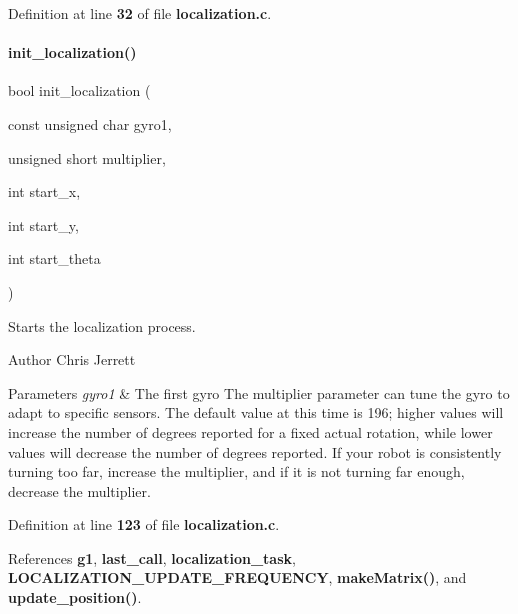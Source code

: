 Definition at line \textbf{ 32} of file \textbf{ localization.\+c}.

\mbox{\label{localization_8c_afdd0147de6aa15957e9a125f9cd20578}} 
\paragraph{init\+\_\+localization()}
{\footnotesize\ttfamily bool init\+\_\+localization (\begin{DoxyParamCaption}\item[{const unsigned char}]{gyro1,  }\item[{unsigned short}]{multiplier,  }\item[{int}]{start\+\_\+x,  }\item[{int}]{start\+\_\+y,  }\item[{int}]{start\+\_\+theta }\end{DoxyParamCaption})}



Starts the localization process. 

\begin{DoxyAuthor}{Author}
Chris Jerrett
\end{DoxyAuthor}

\begin{DoxyParams}{Parameters}
{\em gyro1} & The first gyro  The multiplier parameter can tune the gyro to adapt to specific sensors. The default value at this time is 196; higher values will increase the number of degrees reported for a fixed actual rotation, while lower values will decrease the number of degrees reported. If your robot is consistently turning too far, increase the multiplier, and if it is not turning far enough, decrease the multiplier. \\
\hline
\end{DoxyParams}


Definition at line \textbf{ 123} of file \textbf{ localization.\+c}.



References \textbf{ g1}, \textbf{ last\+\_\+call}, \textbf{ localization\+\_\+task}, \textbf{ L\+O\+C\+A\+L\+I\+Z\+A\+T\+I\+O\+N\+\_\+\+U\+P\+D\+A\+T\+E\+\_\+\+F\+R\+E\+Q\+U\+E\+N\+CY}, \textbf{ make\+Matrix()}, and \textbf{ update\+\_\+position()}.

\mbox{\label{localization_8c_ac103fff038e59ff45f292b9b5138182e}} 
